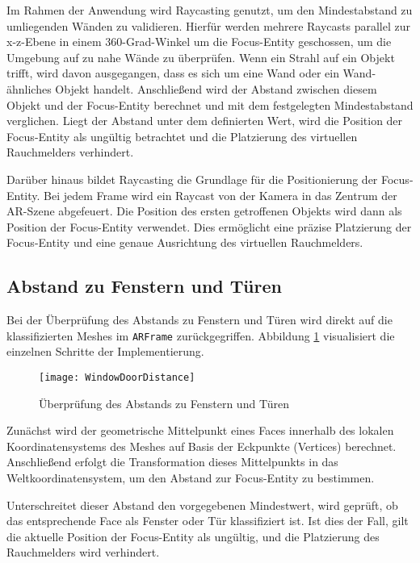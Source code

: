 Im Rahmen der Anwendung wird Raycasting genutzt, um den Mindestabstand zu umliegenden Wänden zu validieren. Hierfür werden mehrere Raycasts parallel zur x-z-Ebene in einem 360-Grad-Winkel um die Focus-Entity geschossen, um die Umgebung auf zu nahe Wände zu überprüfen. Wenn ein Strahl auf ein Objekt trifft, wird davon ausgegangen, dass es sich um eine Wand oder ein Wand-ähnliches Objekt handelt. Anschließend wird der Abstand zwischen diesem Objekt und der Focus-Entity berechnet und mit dem festgelegten Mindestabstand verglichen. Liegt der Abstand unter dem definierten Wert, wird die Position der Focus-Entity als ungültig betrachtet und die Platzierung des virtuellen Rauchmelders verhindert.

Darüber hinaus bildet Raycasting die Grundlage für die Positionierung der Focus-Entity. Bei jedem Frame wird ein Raycast von der Kamera in das Zentrum der AR-Szene abgefeuert. Die Position des ersten getroffenen Objekts wird dann als Position der Focus-Entity verwendet. Dies ermöglicht eine präzise Platzierung der Focus-Entity und eine genaue Ausrichtung des virtuellen Rauchmelders.

\subsection{Abstand zu Fenstern und Türen}

Bei der Überprüfung des Abstands zu Fenstern und Türen wird direkt auf die klassifizierten Meshes im \texttt{ARFrame} zurückgegriffen. Abbildung \ref{fig:WindowDoorDistance} visualisiert die einzelnen Schritte der Implementierung.

\begin{figure}[ht]
    \centering
    \texttt{[image: WindowDoorDistance]}
    \caption{Überprüfung des Abstands zu Fenstern und Türen}
    \label{fig:WindowDoorDistance}
\end{figure}

Zunächst wird der geometrische Mittelpunkt eines Faces innerhalb des lokalen Koordinatensystems des Meshes auf Basis der Eckpunkte (Vertices) berechnet. Anschließend erfolgt die Transformation dieses Mittelpunkts in das Weltkoordinatensystem, um den Abstand zur Focus-Entity zu bestimmen.

Unterschreitet dieser Abstand den vorgegebenen Mindestwert, wird geprüft, ob das entsprechende Face als Fenster oder Tür klassifiziert ist. Ist dies der Fall, gilt die aktuelle Position der Focus-Entity als ungültig, und die Platzierung des Rauchmelders wird verhindert.

